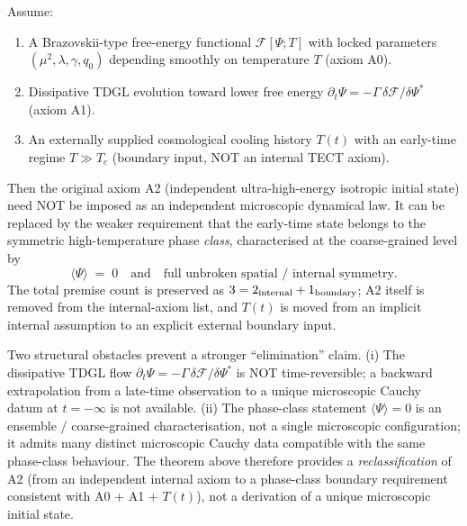\begin{theorem}
\label{thm:main}
Assume:
\begin{enumerate}
\item A Brazovskii-type free-energy functional $\mathcal{F}[\Psi; T]$
  with locked parameters $(\mu^2, \lambda, \gamma, q_0)$ depending
  smoothly on temperature $T$ (axiom A0).
\item Dissipative TDGL evolution toward lower free energy
  $\partial_t \Psi = -\Gamma\, \delta \mathcal{F} / \delta \Psi^*$
  (axiom A1).
\item An externally supplied cosmological cooling history $T(t)$ with
  an early-time regime $T \gg T_c$ (boundary input, NOT an internal
  TECT axiom).
\end{enumerate}

Then the original axiom A2 (independent ultra-high-energy isotropic
initial state) need NOT be imposed as an independent microscopic
dynamical law. It can be replaced by the weaker requirement that the
early-time state belongs to the symmetric high-temperature phase
\emph{class}, characterised at the coarse-grained level by
\[
\langle \Psi \rangle \;=\; 0
\quad \text{and} \quad
\text{full unbroken spatial / internal symmetry.}
\]
The total premise count is preserved as $3 = 2_{\rm internal} +
1_{\rm boundary}$; A2 itself is removed from the internal-axiom list,
and $T(t)$ is moved from an implicit internal assumption to an
explicit external boundary input.
\end{theorem}

\begin{remark}
\label{rem:weak-not-elim}
Two structural obstacles prevent a stronger ``elimination'' claim. (i)
The dissipative TDGL flow $\partial_t \Psi = -\Gamma\,\delta
\mathcal{F} / \delta \Psi^*$ is NOT time-reversible; a backward
extrapolation from a late-time observation to a unique microscopic
Cauchy datum at $t = -\infty$ is not available. (ii) The phase-class
statement $\langle \Psi \rangle = 0$ is an ensemble / coarse-grained
characterisation, not a single microscopic configuration; it admits
many distinct microscopic Cauchy data compatible with the same
phase-class behaviour. The theorem above therefore provides a
\emph{reclassification} of A2 (from an independent internal axiom to a
phase-class boundary requirement consistent with A0 + A1 + $T(t)$),
not a derivation of a unique microscopic initial state.
\end{remark}

